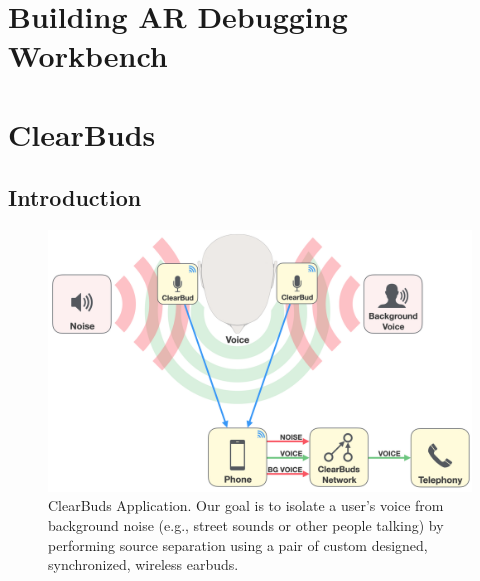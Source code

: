 \documentclass [11pt, proquest] {uwthesis}[2020/02/24]
\begin{document}





\chapter{Building AR Debugging Workbench}




\chapter{ClearBuds}

\section{Introduction}




\begin{figure}
\centering
 \includegraphics[width=0.75\linewidth]{CB_figures/flow-diagram-6.png}
\vskip -0.1in
\caption{{ ClearBuds Application.  Our goal is to isolate a user's voice from background noise (e.g., street sounds or other people talking) by performing source separation  using a pair of custom designed, synchronized, wireless earbuds.}}
\label{fig:block_diagram}
\vskip -0.15in
\end{figure}



\end{document}
